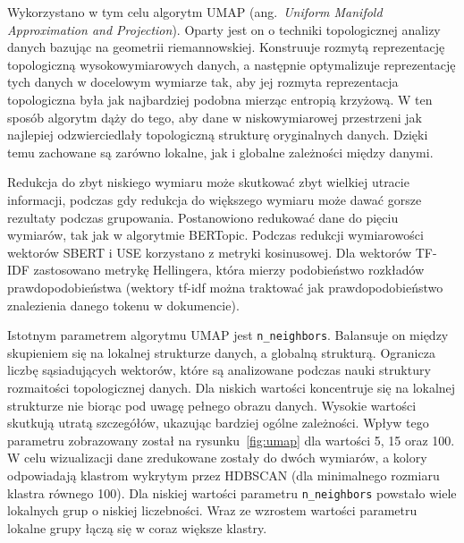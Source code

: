 	Wykorzystano w tym celu algorytm UMAP (ang.\ \emph{Uniform Manifold Approximation and Projection})\cite{UMAP}.
	Oparty jest on o techniki topologicznej analizy danych bazując na geometrii riemannowskiej.
	Konstruuje rozmytą reprezentację topologiczną wysokowymiarowych danych,
		a następnie optymalizuje reprezentację tych danych w docelowym wymiarze tak,
		aby jej rozmyta reprezentacja topologiczna była jak najbardziej podobna mierząc entropią krzyżową.
	W ten sposób algorytm dąży do tego, aby dane w niskowymiarowej przestrzeni jak najlepiej odzwierciedlały topologiczną strukturę oryginalnych danych.
	Dzięki temu zachowane są zarówno lokalne, jak i globalne zależności między danymi.

	Redukcja do zbyt niskiego wymiaru może skutkować zbyt wielkiej utracie informacji,
		podczas gdy redukcja do większego wymiaru może dawać gorsze rezultaty podczas grupowania.
	Postanowiono redukować dane do pięciu wymiarów, tak jak w algorytmie BERTopic.
	Podczas redukcji wymiarowości wektorów SBERT i USE korzystano z metryki kosinusowej.
	Dla wektorów TF-IDF zastosowano metrykę Hellingera, która mierzy podobieństwo rozkładów prawdopodobieństwa
		(wektory tf-idf można traktować jak prawdopodobieństwo znalezienia danego tokenu w dokumencie).
	
	Istotnym parametrem algorytmu UMAP jest \verb|n_neighbors|.
	Balansuje on między skupieniem się na lokalnej strukturze danych, a globalną strukturą.
	Ogranicza liczbę sąsiadujących wektorów, które są analizowane podczas nauki struktury rozmaitości topologicznej danych.
	Dla niskich wartości koncentruje się na lokalnej strukturze nie biorąc pod uwagę pełnego obrazu danych.
	Wysokie wartości skutkują utratą szczegółów, ukazując bardziej ogólne zależności.
	Wpływ tego parametru zobrazowany został na rysunku~\ref{fig:umap} dla wartości 5, 15 oraz 100.
	W celu wizualizacji dane zredukowane zostały do dwóch wymiarów,
		a kolory odpowiadają klastrom wykrytym przez HDBSCAN (dla minimalnego rozmiaru klastra równego 100).
	Dla niskiej wartości parametru \verb|n_neighbors| powstało wiele lokalnych grup o niskiej liczebności.
	Wraz ze wzrostem wartości parametru lokalne grupy łączą się w coraz większe klastry.

